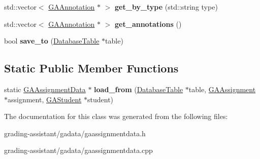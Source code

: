 \begin{DoxyCompactItemize}
\item 
\mbox{\label{class_g_a_assignment_data_a92242c8196bf3f97927ecc11fa52c816}} 
std\+::vector$<$ \hyperlink{class_g_a_annotation}{G\+A\+Annotation} $\ast$ $>$ {\bfseries get\+\_\+by\+\_\+type} (std\+::string type)
\item 
\mbox{\label{class_g_a_assignment_data_ac64a01956680a8700dca510945e84709}} 
std\+::vector$<$ \hyperlink{class_g_a_annotation}{G\+A\+Annotation} $\ast$ $>$ {\bfseries get\+\_\+annotations} ()
\item 
\mbox{\label{class_g_a_assignment_data_a09c5f8e49023e513fca995ed192e6faf}} 
bool {\bfseries save\+\_\+to} (\hyperlink{class_database_table}{Database\+Table} $\ast$table)
\end{DoxyCompactItemize}
\subsection*{Static Public Member Functions}
\begin{DoxyCompactItemize}
\item 
\mbox{\label{class_g_a_assignment_data_a31ed802f1ef4b21bd9f47024a80bf4bd}} 
static \hyperlink{class_g_a_assignment_data}{G\+A\+Assignment\+Data} $\ast$ {\bfseries load\+\_\+from} (\hyperlink{class_database_table}{Database\+Table} $\ast$table, \hyperlink{class_g_a_assignment}{G\+A\+Assignment} $\ast$assignment, \hyperlink{class_g_a_student}{G\+A\+Student} $\ast$student)
\end{DoxyCompactItemize}


The documentation for this class was generated from the following files\+:\begin{DoxyCompactItemize}
\item 
grading-\/assistant/gadata/gaassignmentdata.\+h\item 
grading-\/assistant/gadata/gaassignmentdata.\+cpp\end{DoxyCompactItemize}
